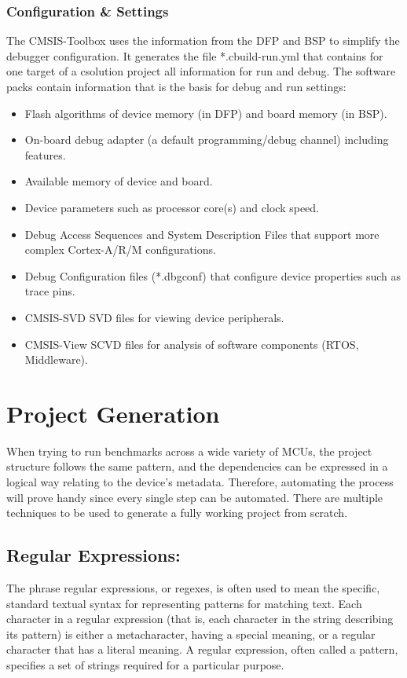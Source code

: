 \subsubsection*{Configuration \& Settings}
The CMSIS-Toolbox uses the information from the DFP and BSP to simplify the debugger configuration. It generates the file *.cbuild-run.yml that contains for one target of a csolution project all information for run and debug.
The software packs contain information that is the basis for debug and run settings:
\begin{itemize}
    \item Flash algorithms of device memory (in DFP) and board memory (in BSP).
    \item On-board debug adapter (a default programming/debug channel) including features.
    \item Available memory of device and board.
    \item Device parameters such as processor core(s) and clock speed.
    \item Debug Access Sequences and System Description Files that support more complex Cortex-A/R/M configurations.
    \item Debug Configuration files (*.dbgconf) that configure device properties such as trace pins.
    \item CMSIS-SVD SVD files for viewing device peripherals.
    \item CMSIS-View SCVD files for analysis of software components (RTOS, Middleware).
\end{itemize}

\section{Project Generation}
When trying to run benchmarks across a wide variety of MCUs, the project structure follows the same pattern, and the dependencies can be expressed in a logical way relating to the device's metadata.
Therefore, automating the process will prove handy since every single step can be automated.
There are multiple techniques to be used to generate a fully working project from scratch.
\subsection{Regular Expressions:}
    The phrase regular expressions, or regexes, is often used to mean the specific, standard textual syntax for representing patterns for matching text. Each character in a regular expression (that is, each character in the string describing its pattern) is either a metacharacter, having a special meaning, or a regular character that has a literal meaning.
    A regular expression, often called a pattern, specifies a set of strings required for a particular purpose. 
